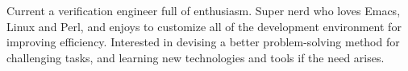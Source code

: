 

\begin{cvparagraph}

Current a verification engineer full of enthusiasm. Super nerd who loves Emacs, Linux and Perl, and enjoys to customize all of the development environment for improving efficiency. Interested in devising a better problem-solving method for challenging tasks, and learning new technologies and tools if the need arises.
\end{cvparagraph}
